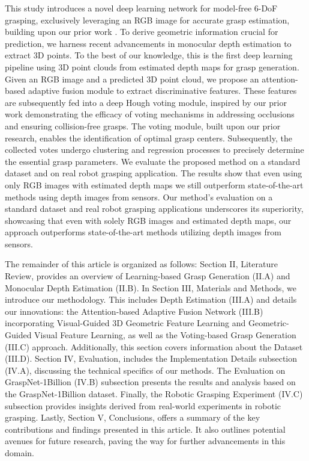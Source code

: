 This study introduces a novel deep learning network for model-free 6-DoF grasping, exclusively leveraging an RGB image for accurate grasp estimation, building upon our prior work \cite{hoang2023grasp}. To derive geometric information crucial for prediction, we harness recent advancements in monocular depth estimation to extract 3D points. To the best of our knowledge, this is the first deep learning pipeline using 3D point clouds from estimated depth maps for grasp generation. Given an RGB image and a predicted 3D point cloud, we propose an attention-based adaptive fusion module to extract discriminative features. These features are subsequently fed into a deep Hough voting module, inspired by our prior work demonstrating the efficacy of voting mechanisms in addressing occlusions and ensuring collision-free grasps. The voting module, built upon our prior research, enables the identification of optimal grasp centers. Subsequently, the collected votes undergo clustering and regression processes to precisely determine the essential grasp parameters. We evaluate the proposed method on a standard dataset and on real robot grasping application. The results show that even using only RGB images with estimated depth maps we still outperform state-of-the-art methods using depth images from sensors. Our method's evaluation on a standard dataset and real robot grasping applications underscores its superiority, showcasing that even with solely RGB images and estimated depth maps, our approach outperforms state-of-the-art methods utilizing depth images from sensors.

The remainder of this article is organized as follows: Section II, Literature Review, provides an overview of Learning-based Grasp Generation (II.A) and Monocular Depth Estimation (II.B). In Section III, Materials and Methods, we introduce our methodology. This includes Depth Estimation (III.A) and details our innovations: the Attention-based Adaptive Fusion Network (III.B) incorporating Visual-Guided 3D Geometric Feature Learning and Geometric-Guided Visual Feature Learning, as well as the Voting-based Grasp Generation (III.C) approach. Additionally, this section covers information about the Dataset (III.D). Section IV, Evaluation, includes the Implementation Details subsection (IV.A), discussing the technical specifics of our methods. The Evaluation on GraspNet-1Billion (IV.B) subsection presents the results and analysis based on the GraspNet-1Billion dataset. Finally, the Robotic Grasping Experiment (IV.C) subsection provides insights derived from real-world experiments in robotic grasping. Lastly, Section V, Conclusions, offers a summary of the key contributions and findings presented in this article. It also outlines potential avenues for future research, paving the way for further advancements in this domain.